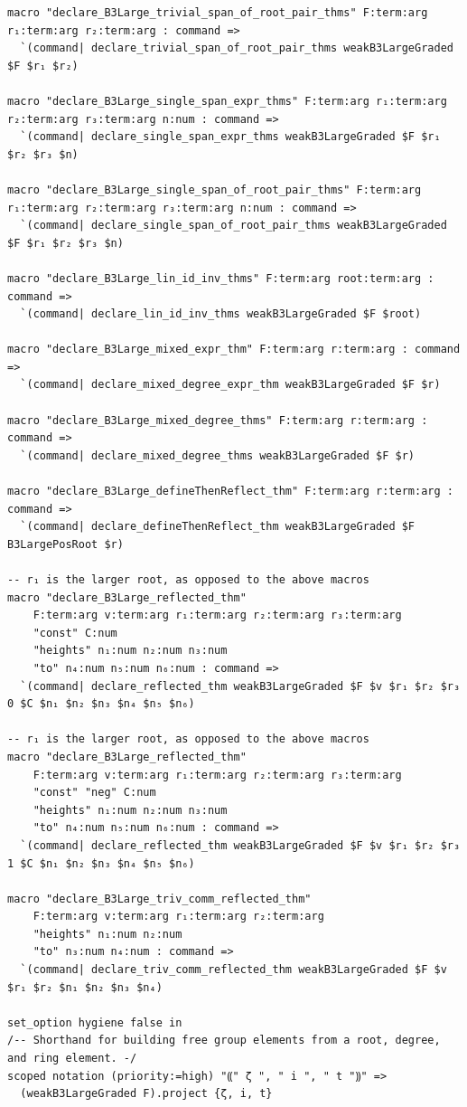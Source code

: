 \documentclass[10pt,a4paper]{article}
\begin{document}
\begin{Verbatim}
macro "declare_B3Large_trivial_span_of_root_pair_thms" F:term:arg r₁:term:arg r₂:term:arg : command =>
  `(command| declare_trivial_span_of_root_pair_thms weakB3LargeGraded $F $r₁ $r₂)

macro "declare_B3Large_single_span_expr_thms" F:term:arg r₁:term:arg r₂:term:arg r₃:term:arg n:num : command =>
  `(command| declare_single_span_expr_thms weakB3LargeGraded $F $r₁ $r₂ $r₃ $n)

macro "declare_B3Large_single_span_of_root_pair_thms" F:term:arg r₁:term:arg r₂:term:arg r₃:term:arg n:num : command =>
  `(command| declare_single_span_of_root_pair_thms weakB3LargeGraded $F $r₁ $r₂ $r₃ $n)

macro "declare_B3Large_lin_id_inv_thms" F:term:arg root:term:arg : command =>
  `(command| declare_lin_id_inv_thms weakB3LargeGraded $F $root)

macro "declare_B3Large_mixed_expr_thm" F:term:arg r:term:arg : command =>
  `(command| declare_mixed_degree_expr_thm weakB3LargeGraded $F $r)

macro "declare_B3Large_mixed_degree_thms" F:term:arg r:term:arg : command =>
  `(command| declare_mixed_degree_thms weakB3LargeGraded $F $r)

macro "declare_B3Large_defineThenReflect_thm" F:term:arg r:term:arg : command =>
  `(command| declare_defineThenReflect_thm weakB3LargeGraded $F B3LargePosRoot $r)

-- r₁ is the larger root, as opposed to the above macros
macro "declare_B3Large_reflected_thm"
    F:term:arg v:term:arg r₁:term:arg r₂:term:arg r₃:term:arg
    "const" C:num
    "heights" n₁:num n₂:num n₃:num
    "to" n₄:num n₅:num n₆:num : command =>
  `(command| declare_reflected_thm weakB3LargeGraded $F $v $r₁ $r₂ $r₃ 0 $C $n₁ $n₂ $n₃ $n₄ $n₅ $n₆)

-- r₁ is the larger root, as opposed to the above macros
macro "declare_B3Large_reflected_thm"
    F:term:arg v:term:arg r₁:term:arg r₂:term:arg r₃:term:arg
    "const" "neg" C:num
    "heights" n₁:num n₂:num n₃:num
    "to" n₄:num n₅:num n₆:num : command =>
  `(command| declare_reflected_thm weakB3LargeGraded $F $v $r₁ $r₂ $r₃ 1 $C $n₁ $n₂ $n₃ $n₄ $n₅ $n₆)

macro "declare_B3Large_triv_comm_reflected_thm"
    F:term:arg v:term:arg r₁:term:arg r₂:term:arg
    "heights" n₁:num n₂:num
    "to" n₃:num n₄:num : command =>
  `(command| declare_triv_comm_reflected_thm weakB3LargeGraded $F $v $r₁ $r₂ $n₁ $n₂ $n₃ $n₄)

set_option hygiene false in
/-- Shorthand for building free group elements from a root, degree, and ring element. -/
scoped notation (priority:=high) "⸨" ζ ", " i ", " t "⸩" =>
  (weakB3LargeGraded F).project {ζ, i, t}


\end{Verbatim}
\end{document}
